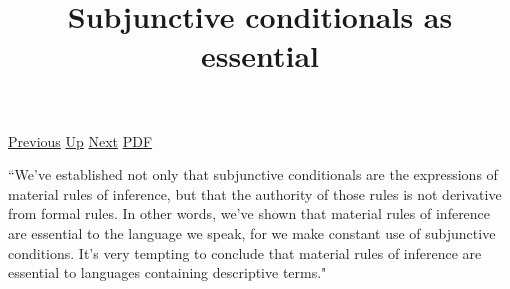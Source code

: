 \documentclass[12pt,a4paper]{report}
\begin{document}
 \href{doc/phil/People/Sellars/Quotes/SpaceofReasons.html}{Previous} 
 \href{doc/phil/People/Sellars/Quotes.html}{Up} 
 \href{doc/phil/People/Sellars/Quotes/Transitiontoconceptualthinking.html}{Next} 
 \href{doc/phil/People/Sellars/Quotes/Subjunctiveconditionalsasessential.pdf}{PDF} 
\title{Subjunctive conditionals as essential}
``We've established not only that subjunctive conditionals are the expressions of material rules of inference, but that the authority of those rules is not derivative from formal rules. In other words, we've shown that material rules of inference are essential to the language we speak, for we make constant use of subjunctive conditions. It's very tempting to conclude that material rules of inference are essential to languages containing descriptive terms."
\end{document}
